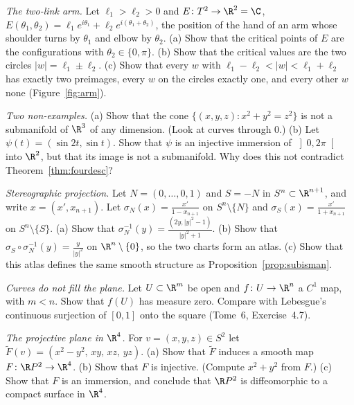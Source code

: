 \begin{exercise}[$\star$]\label{ex:twolinkarm}
\emph{The two-link arm.} Let $\ell_1>\ell_2>0$ and $E\colon T^2\to\R^2=\C$, $E(\theta_1,\theta_2)=\ell_1e^{i\theta_1}+\ell_2e^{i(\theta_1+\theta_2)}$, the
position of the hand of an arm whose shoulder turns by $\theta_1$ and elbow by $\theta_2$. (a) Show that the critical points of $E$ are the
configurations with $\theta_2\in\{0,\pi\}$. (b) Show that the critical values are the two circles $|w|=\ell_1\pm\ell_2$. (c) Show that every $w$ with
$\ell_1-\ell_2<|w|<\ell_1+\ell_2$ has exactly two preimages, every $w$ on the circles exactly one, and every other $w$ none (Figure~\ref{fig:arm}).
\end{exercise}

\begin{exercise}[$\star$]\label{ex:nosubmanifold}
\emph{Two non-examples.} (a) Show that the cone $\{(x,y,z):x^2+y^2=z^2\}$ is not a submanifold of $\R^3$ of any dimension. (Look at curves through $0$.)
(b) Let $\psi(t)=(\sin2t,\sin t)$. Show that $\psi$ is an injective immersion of $\left]0,2\pi\right[$ into $\R^2$, but that its image is not a submanifold.
Why does this not contradict Theorem~\ref{thm:fourdesc}?
\end{exercise}

\begin{exercise}[$\star$]\label{ex:stereographic}
\emph{Stereographic projection.} Let $N=(0,\dots,0,1)$ and $S=-N$ in $S^n\subset\R^{n+1}$, and write $x=(x',x_{n+1})$. Let
$\sigma_N(x)=\frac{x'}{1-x_{n+1}}$ on $S^n\setminus\{N\}$ and $\sigma_S(x)=\frac{x'}{1+x_{n+1}}$ on $S^n\setminus\{S\}$. (a) Show that
$\sigma_N^{-1}(y)=\frac{(2y,|y|^2-1)}{|y|^2+1}$. (b) Show that $\sigma_S\circ\sigma_N^{-1}(y)=\frac y{|y|^2}$ on $\R^n\setminus\{0\}$, so the two charts form an
atlas. (c) Show that this atlas defines the same smooth structure as Proposition~\ref{prop:subisman}.
\end{exercise}

\begin{exercise}[$\star$]\label{ex:minisard}
\emph{Curves do not fill the plane.} Let $U\subset\R^m$ be open and $f\colon U\to\R^n$ a $C^1$ map, with $m<n$. Show that $f(U)$ has measure zero. Compare
with Lebesgue's continuous surjection of $[0,1]$ onto the square (Tome~6, Exercise~4.7).
\end{exercise}

\begin{exercise}[$\star\star$]\label{ex:rp2}
\emph{The projective plane in $\R^4$.} For $v=(x,y,z)\in S^2$ let $\tilde F(v)=(x^2-y^2,\,xy,\,xz,\,yz)$. (a) Show that $\tilde F$ induces a smooth map
$F\colon\R P^2\to\R^4$. (b) Show that $F$ is injective. (Compute $x^2+y^2$ from $F$.) (c) Show that $F$ is an immersion, and conclude that $\R P^2$ is
diffeomorphic to a compact surface in $\R^4$.
\end{exercise}

